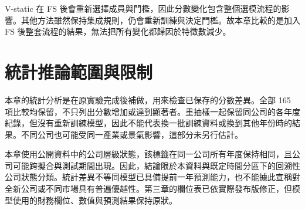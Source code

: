V-static 在 FS 後會重新選擇成員與門檻，因此分數變化包含整個選模流程的影響。其他方法雖然保持集成規則，仍會重新訓練與決定門檻。故本章比較的是加入 FS 後整套流程的結果，無法把所有變化都歸因於特徵數減少。

\section{統計推論範圍與限制}

本章的統計分析是在原實驗完成後補做，用來檢查已保存的分數差異。全部 165 項比較均保留，不只列出分數增加或達到顯著者。重抽樣一起保留同公司的各年度紀錄，但沒有重新訓練模型，因此不能代表換一批訓練資料或換到其他年份時的結果。不同公司也可能受同一產業或景氣影響，這部分未另行估計。

本章使用公開資料中的公司層級狀態，該標籤在同一公司所有年度保持相同，且公司可能跨擬合與測試期間出現。因此，結論限於本資料與既定時間分區下的回溯性公司狀態分類。統計差異不等同模型已具備提前一年預測能力，也不能據此宣稱對全新公司或不同市場具有普遍優越性。第三章的欄位表已依實際發布版修正，但模型使用的財務欄位、數值與預測結果保持原狀。
\endgroup
